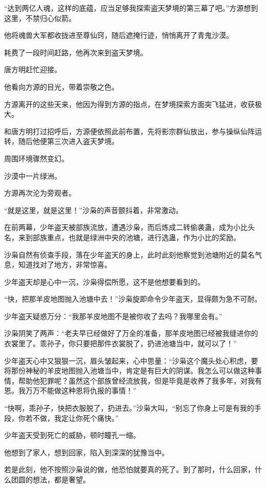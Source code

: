 \begin{this_body}
“达到两亿人魂，这样的底蕴，应当足够我探索盗天梦境的第三幕了吧。”方源想到这里，不禁归心似箭。

他将魂兽大军都收拢进至尊仙窍，随后遮掩行迹，悄悄离开了青鬼沙漠。

耗费了一段时间赶路，他再次来到盗天梦境。

唐方明赶忙迎接。

他看向方源的目光，带着崇敬之色。

方源离开的这些天来，他因为得到方源的指点，在梦境探索方面突飞猛进，收获极大。

和唐方明打过招呼后，方源便依照此前布置，先将影宗群仙放出，参与操纵仙阵运转，随后他便第三次进入盗天梦境。

周围环境骤然变幻。

沙漠中一片绿洲。

方源再次沦为旁观者。

“就是这里，就是这里！”沙枭的声音颤抖着，非常激动。

在前两幕，少年盗天被部族流放，遭遇沙枭，而后炼成二转偷袭蛊，成为小比头名，来到部族重点，也就是绿洲中央的池塘，进行选蛊，作为小比的奖励。

沙枭自然有侦查手段，落在少年盗天的身上，此时此刻他察觉到池塘附近的莫名气息，知道找对了地方，非常惊喜。

少年盗天却是心中一沉，沙枭得偿所愿，这不是他想要看到的。

“快，把那羊皮地图抛入池塘中去！”沙枭旋即命令少年盗天，显得颇为急不可耐。

少年盗天疑惑万分：“我那羊皮地图不是被你收了去吗？我哪里会有。”

沙枭阴笑了两声：“老夫早已经做好了万全的准备，那羊皮地图已经被我缝进你的衣裳里了。乖孙子，你只要把那件衣裳脱了，扔进池塘当中，就可以了！”

少年盗天心中又狠狠一沉，眉头皱起来，心中思量：“沙枭这个魔头处心积虑，要将那份神秘的羊皮地图抛入池塘当中，肯定是有巨大的阴谋。我怎么可以做这种事情，帮助他犯罪呢？虽然这个部族曾经流放我，但是毕竟是收养了我多年，对我有恩。我万万不能做这种恩将仇报的事情！”

“快啊，乖孙子，快把衣服脱了，扔进去。”沙枭大叫，“别忘了你身上可是有我的手段，你若不做，我定让你死个痛快。”

少年盗天受到死亡的威胁，顿时瞳孔一缩。

他想到了家人，想到回家，陷入到深深的犹豫当中。

若是此刻，他不按照沙枭说的做，他恐怕就要真的死了。到了那时，什么回家，什么团圆的想法，都是奢望。


\end{this_body}
